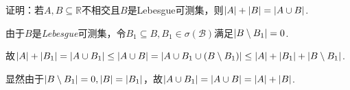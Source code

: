 \begin{comment}
\begin{problem}[7]\label{2.D.7}
    证明若\(A \subseteq \mathbb{R}\)是Lebesgue可测集，则存在开集\(G_1 \supseteq G_2 \supseteq \dots \supseteq A\)，

    且满足\(\abs*{\bigcup_{n=1}^\infty G_n \setminus A}=0\).
\end{problem}

\begin{proof}
    令开集\(D_k\)满足\(\abs*{D_k \setminus A}<1/k\)，令\(G_n=\bigcup_{k=1}^n D_k\).
\end{proof}
\end{comment}

\begin{problem}[10]\label{2.D.10}
    证明：若\(A,B \subseteq \mathbb{R}\)不相交且\(B\)是Lebesgue可测集，则\(\abs*{A}+\abs*{B}=\abs*{A \cup B}\).
\end{problem}

由于\(B\)是\textit{Lebesgue}可测集，令\(B_1 \subseteq B, B_1 \in \sigma(\mathcal{B})\)满足\(\abs*{B \setminus B_1}=0\).

故\(\abs*{A}+\abs*{B_1}=\abs*{A \cup B_1} \leq \abs*{A \cup B}=\abs*{A \cup B_1 \cup (B \setminus B_1)} \leq \abs*{A}+\abs*{B_1}+\abs*{B \setminus B_1}\).

显然由于\(\abs*{B \setminus B_1}=0, \abs*{B}=\abs*{B_1}\)，故\(\abs*{A \cup B_1}=\abs*{A \cup B}=\abs*{A}+\abs*{B}\).

\begin{comment}
    \begin{problem}[12]\label{2.D.12}
        设\(b<c\)且\(A \subseteq (b,c)\).证明\(A\)是Lebesgue可测集等价于\(\abs*{A}+\abs*{(b,c) \setminus A}=c-b\).
    \end{problem}

    \begin{proof}
        若\(A\)是\textit{Lebesgue}可测集，那么\((b,c) \setminus A\)也是\textit{Lebesgue}可测集且不相交.

        于是\(\abs*{A}+\abs*{(b,c) \setminus A}=\abs*{(b,c)}=c-b\)，证毕.

        \(\forall A \subseteq \mathbb{R}, \exists G_1 \supseteq G_2 \supseteq \dots A, \abs*{G_k}-\abs*{A}<1/n\)，令\(G=\bigcap_{k=1}^\infty G_k\)，则\(\abs*{G}=\abs*{A}\).

        由于\(G\)是\textit{borel}集，故\(\abs*{G}+\abs*{(b,c) \setminus G}=c-b\)，得\(\abs*{(b,c) \setminus A}=\abs*{(b,c) \setminus G}\).

        \(\abs*{G \setminus A}=\abs*{((b,c) \setminus A) \setminus ((b,c) \setminus G)} \geq \abs*{(b,c) \setminus A}-\abs*{(b,c) \setminus G}\)
    \end{proof}
\end{comment}

